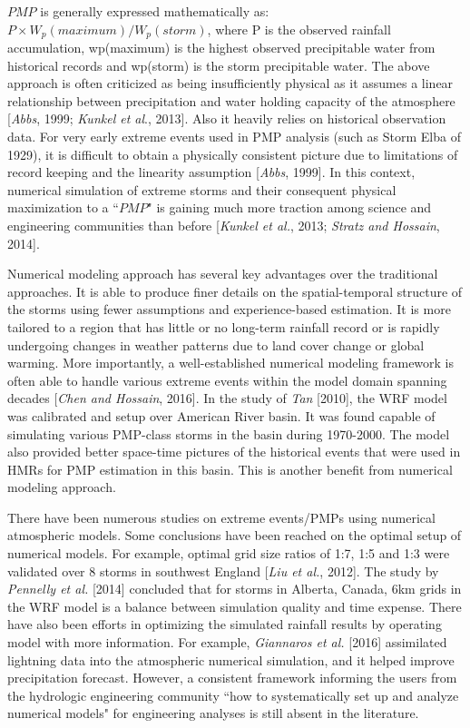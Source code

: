 $PMP$ is generally expressed mathematically as: $P×W_p(maximum)/W_p(storm)$, where P is the observed rainfall accumulation, wp(maximum) is the highest observed precipitable water from historical records and wp(storm) is the storm precipitable water. The above approach is often criticized as being insufficiently physical as it assumes a linear relationship between precipitation and water holding capacity of the atmosphere [\textit{Abbs}, 1999; \textit{Kunkel et al}., 2013]. Also it heavily relies on historical observation data. For very early extreme events used in PMP analysis (such as Storm Elba of 1929), it is difficult to obtain a physically consistent picture due to limitations of record keeping and the linearity assumption [\textit{Abbs}, 1999]. In this context, numerical simulation of extreme storms and their consequent physical maximization to a ``$PMP$" is gaining much more traction among science and engineering communities than before [\textit{Kunkel et al.}, 2013; \textit{Stratz and Hossain}, 2014].

Numerical modeling approach has several key advantages over the traditional approaches. It is able to produce finer details on the spatial-temporal structure of the storms using fewer assumptions and experience-based estimation. It is more tailored to a region that has little or no long-term rainfall record or is rapidly undergoing changes in weather patterns due to land cover change or global warming. More importantly, a well-established numerical modeling framework is often able to handle various extreme events within the model domain spanning decades [\textit{Chen and Hossain}, 2016]. In the study of \textit{Tan} [2010], the WRF model was calibrated and setup over American River basin. It was found capable of simulating various PMP-class storms in the basin during 1970-2000. The model also provided better space-time pictures of the historical events that were used in HMRs for PMP estimation in this basin. This is another benefit from numerical modeling approach.

There have been numerous studies on extreme events/PMPs using numerical atmospheric models. Some conclusions have been reached on the optimal setup of numerical models. For example, optimal grid size ratios of 1:7, 1:5 and 1:3 were validated over 8 storms in southwest England [\textit{Liu et al.}, 2012]. The study by \textit{Pennelly et al.} [2014] concluded that for storms in Alberta, Canada, 6km grids in the WRF model is a balance between simulation quality and time expense. There have also been efforts in optimizing the simulated rainfall results by operating model with more information. For example, \textit{Giannaros et al.} [2016] assimilated lightning data into the atmospheric numerical simulation, and it helped improve precipitation forecast. However, a consistent framework informing the users from the hydrologic engineering community ``how to systematically set up and analyze numerical models" for engineering analyses is still absent in the literature.

